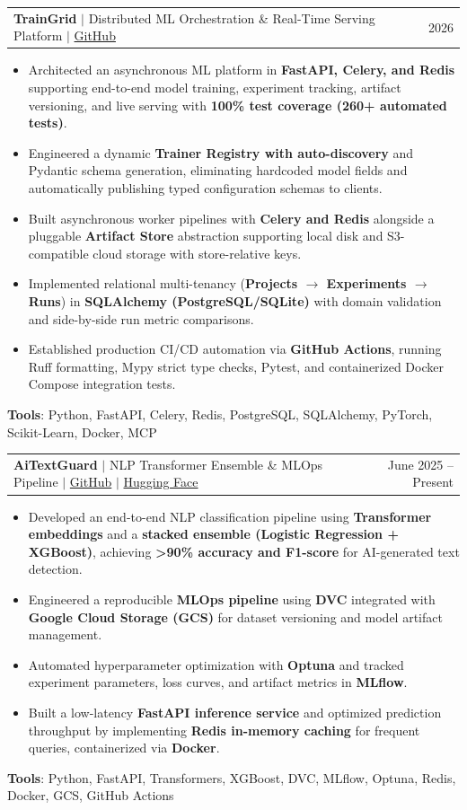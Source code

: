 \documentclass[letterpaper,11pt]{article}
\makeatletter
\newcommand{\resumeItem}[1]{
  \item\small{
    {#1 \vspace{-2pt}}
  }
}
\newcommand{\resumeProjectHeading}[2]{
    \item
    \begin{tabular*}{0.97\textwidth}{l@{\extracolsep{\fill}}r}
      \small#1 & #2 \\
    \end{tabular*}\vspace{-7pt}
}
\newcommand{\resumeItemListStart}{\begin{itemize}}
\newcommand{\resumeItemListEnd}{\end{itemize}\vspace{-5pt}}
\makeatother
\begin{document}
    \resumeProjectHeading
      {\textbf{TrainGrid} $|$ Distributed ML Orchestration \& Real-Time Serving Platform $|$ \href{https://github.com/Sip4818/TrainGrid}{GitHub}}{2026}
      \resumeItemListStart
        \resumeItem{Architected an asynchronous ML platform in \textbf{FastAPI, Celery, and Redis} supporting end-to-end model training, experiment tracking, artifact versioning, and live serving with \textbf{100\% test coverage (260+ automated tests)}.}
        \resumeItem{Engineered a dynamic \textbf{Trainer Registry with auto-discovery} and Pydantic schema generation, eliminating hardcoded model fields and automatically publishing typed configuration schemas to clients.}
        \resumeItem{Built asynchronous worker pipelines with \textbf{Celery and Redis} alongside a pluggable \textbf{Artifact Store} abstraction supporting local disk and S3-compatible cloud storage with store-relative keys.}
        \resumeItem{Implemented relational multi-tenancy (\textbf{Projects $\rightarrow$ Experiments $\rightarrow$ Runs}) in \textbf{SQLAlchemy (PostgreSQL/SQLite)} with domain validation and side-by-side run metric comparisons.}
        \resumeItem{Established production CI/CD automation via \textbf{GitHub Actions}, running Ruff formatting, Mypy strict type checks, Pytest, and containerized Docker Compose integration tests.}
      \resumeItemListEnd
      \small{\textbf{Tools}: Python, FastAPI, Celery, Redis, PostgreSQL, SQLAlchemy, PyTorch, Scikit-Learn, Docker, MCP}

    \vspace{2pt}

    \resumeProjectHeading
      {\textbf{AiTextGuard} $|$ NLP Transformer Ensemble \& MLOps Pipeline $|$ \href{https://github.com/Sip4818/AICheatTextGuard}{GitHub} $|$ \href{https://huggingface.co/spaces/Sahil4818/ai-text-guard}{Hugging Face}}{June 2025 -- Present}
      \resumeItemListStart
        \resumeItem{Developed an end-to-end NLP classification pipeline using \textbf{Transformer embeddings} and a \textbf{stacked ensemble (Logistic Regression + XGBoost)}, achieving \textbf{>90\% accuracy and F1-score} for AI-generated text detection.}
        \resumeItem{Engineered a reproducible \textbf{MLOps pipeline} using \textbf{DVC} integrated with \textbf{Google Cloud Storage (GCS)} for dataset versioning and model artifact management.}
        \resumeItem{Automated hyperparameter optimization with \textbf{Optuna} and tracked experiment parameters, loss curves, and artifact metrics in \textbf{MLflow}.}
        \resumeItem{Built a low-latency \textbf{FastAPI inference service} and optimized prediction throughput by implementing \textbf{Redis in-memory caching} for frequent queries, containerized via \textbf{Docker}.}
      \resumeItemListEnd
      \small{\textbf{Tools}: Python, FastAPI, Transformers, XGBoost, DVC, MLflow, Optuna, Redis, Docker, GCS, GitHub Actions}
\end{document}
